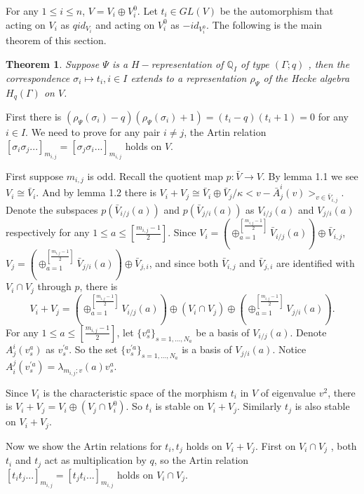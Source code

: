\def\CTEXPreproc{Created by ctex v0.2.12, don't edit!}\documentclass[11pt]{article}
\newtheorem{thm}{Theorem}[section]
\begin{document}
For any $1\leq i\leq n$, $V= V_i \oplus V^0 _i$.  Let  $t_i \in GL( V )$ be the automorphism that acting on $V_i$ as $q id_{V_i }$ and acting on $V^0 _i$ as $-id_{V^0 _i }$.  The following is the main theorem of this section.


\begin{thm} Suppose $\Psi$ is a $H-$representation of $\mathbb{Q}_I$ of type $(\Gamma ;q)$ , then the correspondence $\sigma _i \mapsto t_i ,i\in I$ extends to a representation $\rho_{\Psi} $ of the Hecke algebra $H_{q} (\Gamma) $ on $V$.


\end{thm}

\begin{pf} First there is $( \rho_{\Psi }(\sigma _i ) -q  ) ( \rho_{\Psi } (\sigma _i ) +1  )=(t_i -q)(t_i +1) =0   $ for any $i\in I$.  We need to prove for any pair $i\neq j $, the Artin relation $ [\sigma_i \sigma_j ...]_{m_{i,j}} = [\sigma_j \sigma_i ... ]_{m_{i,j}} $ holds on $V$.

  First suppose  $m_{i,j}$ is odd.  Recall the quotient map $p: \bar{V} \rightarrow V$. By lemma 1.1 we see $V_i \cong \bar{V}_i $. And by lemma 1.2 there is
 $V_i + V_j \cong \bar{V}_i \oplus \bar{V}_j / \kappa < v - \bar{A}^i _j (v)  >_{v\in \bar{V}_{i,j}}$.
Denote the subspaces $p( \bar{V}_{i/j}(a)   )$ and $p( \bar{V}_{j/i}(a) )$ as $V_{i/j}(a)$ and $V_{j/i}(a)$ respectively for any $1\leq a\leq [\frac{m_{i,j}-1}{2}]$. Since
$V_i = ( \oplus^{[\frac{m_{i,j}-1}{2}]}_{a=1} \bar{V}_{i/j}(a) )\oplus \bar{V}_{i,j}$, $V_j = ( \oplus^{[\frac{m_{i,j}-1}{2}]}_{a=1} \bar{V}_{j/i}(a) ) \oplus \bar{V}_{j,i}   $, and since both
$\bar{V}_{i,j}$ and $\bar{V}_{j,i}$ are identified with $V_i \cap V_j $ through $p$, there is
\[V_{i} + V_{j} =  (  \oplus^{[\frac{m_{i,j}-1}{2}]}_{a=1} V_{i/j}(a) ) \oplus (V_i \cap V_j ) \oplus (  \oplus^{[\frac{m_{i,j}-1}{2}]}_{a=1} V_{j/i}(a)  ) .\]
 For any $1 \leq a\leq [\frac{m_{i,j}-1}{2}] $,  let $\{  v^a _{s}   \}_{s=1,..., N_a }$ be a basis of $V_{i/j}(a)$. Denote $A^i _j (v^a _{s})$ as $v^{' a} _{s}$. So the set $\{ v^{' a} _{s} \}_{s=1,...,N_a } $ is a basis of $V_{j/i}(a)$. Notice $A^j _i (v^{' a} _{s}) = \lambda _{m_{i,j};v} (a) v^a _{s}$.

 Since $V_i $ is the characteristic space of the morphism $t_i $ in $V$ of eigenvalue $v^2 $, there is  $V_i + V_j = V_i \oplus (V_j \cap V^0 _i )$. So $t_i $ is stable on $V_i + V_j$. Similarly  $t_j$ is also stable on $V_i + V_j $.

 Now we show the Artin relations for $t_i , t_j$ holds on $V_i + V_j$.   First on $V_i \cap V_j$ , both $t_i$ and $t_j$ act as multiplication by $q$, so the Artin relation $ [t_i t_j ...]_{m_{i,j}} = [t_j t_i ... ]_{m_{i,j}} $ holds on $V_i \cap V_j$.


\end{pf}
\end{document}
